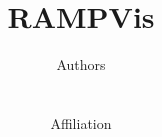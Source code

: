 \documentclass{egpubl}
\begin{document}
\author[Authors]
{
\parbox{\textwidth}{\centering Authors }
\\
\parbox{\textwidth}{\centering Affiliation \\
}
}

\title{RAMPVis}

\pagestyle{plain}

\maketitle

\begin{abstract}

\end{abstract}



% 

% 

% 

% 

% 

% 


\let\section=\origsection
\printbibliography

\clearpage

% 
\end{document}
